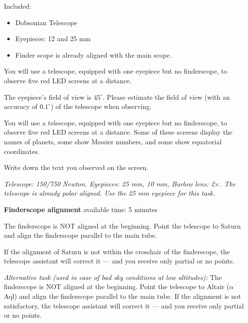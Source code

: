 Included:
\begin{itemize}
\item Dobsonian Telescope
\item Eyepieces: 12 and 25 mm
\item Finder scope is already aligned with the main scope.
\end{itemize}

You will use a telescope, equipped with one eyepiece but no finderscope, to
observe five red LED screens at a distance.

The eyepiece's field of view is $45^\circ$. Please estimate the field of
view (with an accuracy of $0.1^\circ$) of the telescope when observing.

You will use a telescope, equipped with one eyepiece but no finderscope, to
observe five red LED screens at a distance. Some of these screens display
the names of planets, some show Messier numbers, and some show equatorial
coordinates.

Write down the text you observed on the screen.

\emph{Telescope: 150/750 Newton. Eyepieces: 25 mm, 10 mm, Barlow lens:
2$\times$. The telescope is already polar aligned. Use the 25 mm eyepiece
for this task.}

\textbf{Finderscope alignment} \hfill available time: 5 minutes

The finderscope is NOT aligned at the beginning. Point the telescope to
Saturn and align the finderscope parallel to the main tube.

If the alignment of Saturn is not within the crosshair of the finderscope,
the telescope assistant will correct it --- and you receive only partial or
no points.

\medskip
\emph{Alternative task (used in case of bad sky conditions at low
altitudes):} The finderscope is NOT aligned at the beginning. Point the
telescope to Altair ($\alpha$ Aql) and align the finderscope parallel to the
main tube. If the alignment is not satisfactory, the telescope assistant
will correct it --- and you receive only partial or no points.

